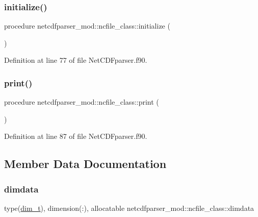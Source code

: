 \subsubsection{\texorpdfstring{initialize()}{initialize()}}
{\footnotesize\ttfamily procedure netcdfparser\+\_\+mod\+::ncfile\+\_\+class\+::initialize (\begin{DoxyParamCaption}{ }\end{DoxyParamCaption})\hspace{0.3cm}{\ttfamily [private]}}



Definition at line 77 of file Net\+C\+D\+Fparser.\+f90.

\mbox{\label{structnetcdfparser__mod_1_1ncfile__class_af7aae078c0672cbfe8e6667311a94dcd}} 
\subsubsection{\texorpdfstring{print()}{print()}}
{\footnotesize\ttfamily procedure netcdfparser\+\_\+mod\+::ncfile\+\_\+class\+::print (\begin{DoxyParamCaption}{ }\end{DoxyParamCaption})\hspace{0.3cm}{\ttfamily [private]}}



Definition at line 87 of file Net\+C\+D\+Fparser.\+f90.



\subsection{Member Data Documentation}
\mbox{\label{structnetcdfparser__mod_1_1ncfile__class_a4dd2f6e32f04a63ad8c3303d76dab84f}} 
\subsubsection{\texorpdfstring{dimdata}{dimdata}}
{\footnotesize\ttfamily type(\mbox{\hyperlink{structnetcdfparser__mod_1_1dim__t}{dim\+\_\+t}}), dimension(\+:), allocatable netcdfparser\+\_\+mod\+::ncfile\+\_\+class\+::dimdata\hspace{0.3cm}{\ttfamily [private]}}



